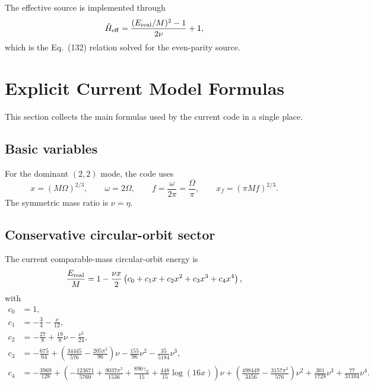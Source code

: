 \documentclass[11pt]{article}
\begin{document}
The effective source is implemented through
\begin{equation}
  \hat H_{\rm eff}
  =
  \frac{(E_{\rm real}/M)^2 - 1}{2\nu} + 1,
\end{equation}
which is the Eq.~(132) relation solved for the even-parity source.

\section{Explicit Current Model Formulas}

This section collects the main formulas used by the current code in a single
place.

\subsection{Basic variables}

For the dominant \((2,2)\) mode, the code uses
\begin{equation}
  x = (M\Omega)^{2/3},
  \qquad
  \omega = 2\Omega,
  \qquad
  f = \frac{\omega}{2\pi} = \frac{\Omega}{\pi},
  \qquad
  x_f = (\pi M f)^{2/3}.
\end{equation}
The symmetric mass ratio is \(\nu=\eta\).

\subsection{Conservative circular-orbit sector}

The current comparable-mass circular-orbit energy is
\begin{equation}
  \frac{E_{\rm real}}{M}
  =
  1 - \frac{\nu x}{2}
  \left(
    c_0 + c_1 x + c_2 x^2 + c_3 x^3 + c_4 x^4
  \right),
\end{equation}
with
\begin{align}
  c_0 &= 1, \\
  c_1 &= -\frac{3}{4} - \frac{\nu}{12}, \\
  c_2 &= -\frac{27}{8} + \frac{19}{8}\nu - \frac{\nu^2}{24}, \\
  c_3 &=
  -\frac{675}{64}
  + \left(\frac{34445}{576} - \frac{205\pi^2}{96}\right)\nu
  - \frac{155}{96}\nu^2
  - \frac{35}{5184}\nu^3, \\
  c_4 &=
  -\frac{3969}{128}
  + \left(
      -\frac{123671}{5760}
      + \frac{9037\pi^2}{1536}
      + \frac{896\gamma_E}{15}
      + \frac{448}{15}\log(16x)
    \right)\nu
  + \left(
      \frac{498449}{3456}
      - \frac{3157\pi^2}{576}
    \right)\nu^2
  + \frac{301}{1728}\nu^3
  + \frac{77}{31104}\nu^4.
\end{align}
\end{document}
